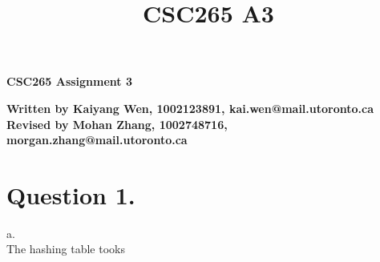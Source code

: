 \documentclass[a4paper]{article}
\begin{document}
\title{CSC265 A3}

\thispagestyle{empty}

\begin{center}
{\LARGE \bf CSC265 Assignment 3}\\

\end{center}
\textbf{Written by Kaiyang Wen, 1002123891, kai.wen@mail.utoronto.ca }\\
\textbf{Revised by Mohan Zhang, 1002748716, morgan.zhang@mail.utoronto.ca}\\
\section{Question 1.}
a.\\
The hashing table tooks \\
\end{document}
